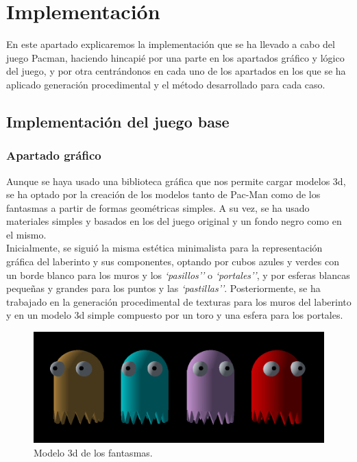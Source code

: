 \section{Implementación}

En este apartado explicaremos la implementación que se ha llevado a cabo del juego Pacman, haciendo hincapié por una parte en los apartados gráfico y lógico del juego, y por otra centrándonos en cada uno de los apartados en los que se ha aplicado generación procedimental y el método desarrollado para cada caso.

\subsection{Implementación del juego base}

\subsubsection{Apartado gráfico}

Aunque se haya usado una biblioteca gráfica que nos permite cargar modelos \acrshort{3d}, se ha optado por la creación de los modelos tanto de Pac-Man como de los fantasmas a partir de formas geométricas simples. A su vez, se ha usado materiales simples y basados en los del juego original y un fondo negro como en el mismo.\\

Inicialmente, se siguió la misma estética minimalista para la representación gráfica del laberinto y sus componentes, optando por cubos azules y verdes con un borde blanco para los muros y los \textit{`pasillos''} o \textit{`portales''}, y por esferas blancas pequeñas y grandes para los puntos y las \textit{`pastillas''}. Posteriormente, se ha trabajado en la generación procedimental de texturas para los muros del laberinto y en un modelo \acrshort{3d} simple compuesto por un toro y una esfera para los portales.\\

\begin{figure}[H]
    \begin{center}
        \includegraphics[scale=0.3]{img/fantasmas.png}
        \caption{Modelo \acrshort{3d} de los fantasmas.}
    \end{center}
\end{figure}

